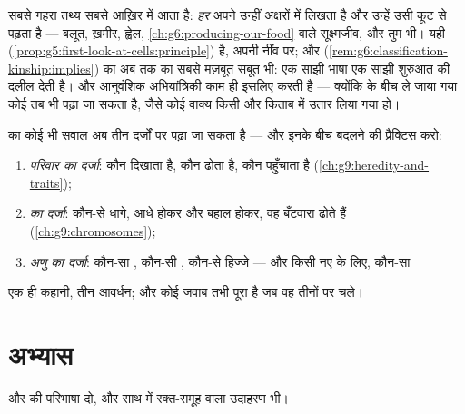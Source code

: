 \begin{remark}[एक ही कूट, और पूरा जीवन]\label{rem:g9:genes-and-dna:universal}
सबसे गहरा तथ्य सबसे आख़िर में आता है: \emph{हर}  अपने  उन्हीं 
अक्षरों में लिखता है और उन्हें उसी कूट से पढ़ता है --- बलूत, ख़मीर,
ह्वेल, \cref{ch:g6:producing-our-food} वाले सूक्ष्मजीव, और तुम भी। यही
 (\cref{prop:g5:first-look-at-cells:principle}) है, अपनी नींव
पर; और  (\cref{rem:g6:classification-kinship:implies}) का
अब तक का सबसे मज़बूत सबूत भी: एक साझी भाषा एक साझी शुरुआत की दलील देती
है। और आनुवंशिक अभियांत्रिकी काम ही इसलिए करती है --- क्योंकि 
के बीच ले जाया गया कोई  तब भी पढ़ा जा सकता है, जैसे कोई वाक्य किसी और
किताब में उतार लिया गया हो।
\end{remark}

\begin{method}[तीन दर्जों की पढ़त]\label{met:g9:genes-and-dna:levels}
 का कोई भी सवाल अब तीन दर्जों पर पढ़ा जा सकता है --- और इनके
बीच बदलने की प्रैक्टिस करो:
\begin{enumerate}
  \item \emph{परिवार का दर्जा}: कौन दिखाता है, कौन ढोता है, कौन
        पहुँचाता है (\cref{ch:g9:heredity-and-traits});
  \item \emph{ का दर्जा}: कौन-से धागे, आधे होकर और बहाल होकर,
        वह बँटवारा ढोते हैं (\cref{ch:g9:chromosomes});
  \item \emph{अणु का दर्जा}: कौन-सा , कौन-सी , कौन-से
        हिज्जे --- और किसी नए  के लिए, कौन-सा ।
\end{enumerate}
एक ही कहानी, तीन आवर्धन; और कोई जवाब तभी पूरा है जब वह तीनों पर चले।
\end{method}

\section{अभ्यास}

\begin{exercise}[$\star$]\label{exo:g9:genes-and-dna:1}
 और  की परिभाषा दो, और साथ में रक्त-समूह वाला उदाहरण भी।
\end{exercise}

